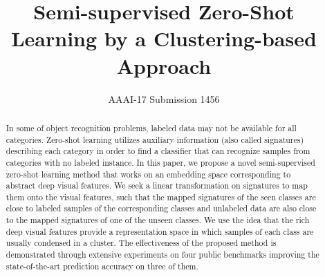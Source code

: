 \documentclass[letterpaper]{article}
\begin{document}
%
\title{Semi-supervised Zero-Shot Learning by a Clustering-based Approach}
 \author{AAAI-17 Submission 1456}

\maketitle

\begin{abstract}
In some of object recognition problems, labeled data may not be available for all categories.
 Zero-shot learning utilizes auxiliary information (also called signatures)
 describing each category in order to find a classifier that can recognize samples
from categories with no labeled instance. %
In this paper, we propose a novel semi-supervised zero-shot learning method that works on an embedding space corresponding to
abstract deep visual features. We seek a linear transformation on signatures to map them onto the visual features,
such that the mapped signatures of the seen classes are close to labeled samples of the corresponding
classes and unlabeled data are also close to the mapped signatures of one of the unseen classes.
 We use the idea that the rich deep visual features provide a representation
 space in which samples of each class are usually condensed in a cluster. The effectiveness of the proposed method is demonstrated through extensive
experiments on four public benchmarks improving the state-of-the-art prediction accuracy on three of them.
\end{abstract}
\end{document}
